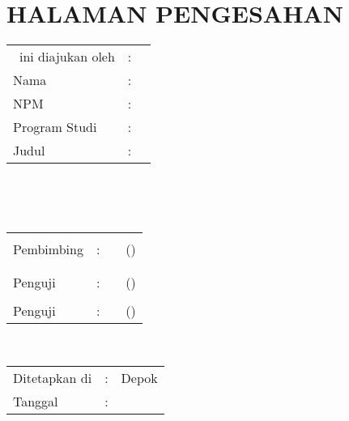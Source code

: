 %
%
%

\chapter*{HALAMAN PENGESAHAN}

\vspace*{0.4cm}
\noindent 

\noindent
\begin{tabular}{ll p{9cm}}
	\type~ini diajukan oleh&: & \\
	Nama&: & \penulis \\
	NPM&: & \npm \\
	Program Studi&: & \program \\
	Judul \type&: & \judul \\
\end{tabular} \\

\vspace*{1.0cm}

\noindent {}\\[0.2cm]

\begin{center}
\end{center}

\vspace*{0.3cm}

\begin{tabular}{l l l l }
	& & & \\
	Pembimbing&: & \pembimbing & (\hspace*{3.0cm}) \\
	& & & \\
	& & & \\
	Penguji&: &  \penguji & (\hspace*{3.0cm}) \\
	& & & \\
	Penguji&: &  \pengujidua & (\hspace*{3.0cm}) \\
\end{tabular}\\

\vspace*{2.0cm}

\begin{tabular}{ll l}
	Ditetapkan di&: & Depok\\
	Tanggal&: & \tanggalLulus \\
\end{tabular}


\newpage
